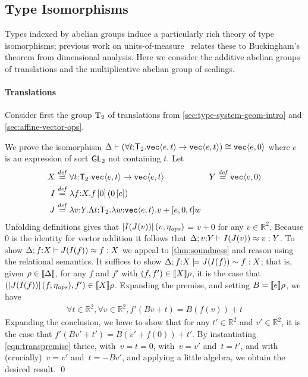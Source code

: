 \subsection{Type Isomorphisms}
\label{sec:types-indexed-abelian-groups}
Types indexed by abelian groups induce a particularly rich theory of
type isomorphisms; previous work on
units-of-measure~\cite{kennedy97relational} relates these to
Buckingham's theorem from dimensional analysis. Here we consider the
additive abelian groups of translations and the multiplicative abelian
group of scalings.

\paragraph{Translations} 
Consider first the group $\mathrm{T}_2$ of translations from
\autoref{sec:type-system-geom-intro} and 
\autoref{sec:affine-vector-ops}. 

\begin{example}\label{ex:simpletrans}
We prove the isomorphism
$\Delta\vdash(\forall t\mathord:\mathsf{T}_2.\textup{\texttt{vec}}\langle e,t \rangle\to\textup{\texttt{vec}}\langle e,t \rangle) \cong
\textup{\texttt{vec}}\langle e,0 \rangle$ where $e$ is an expression of sort $\mathsf{GL}_2$ not containing $t$.
Let 
\begin{align*}
X & \stackrel{\mathit{def}}=\forall t\mathord:\mathsf{T}_2.\textup{\texttt{vec}}\langle e,t \rangle\to\textup{\texttt{vec}}\langle e,t \rangle
&
Y & \stackrel{\mathit{def}}=\textup{\texttt{vec}}\langle e,0 \rangle\\
I & \stackrel{\mathit{def}}=\lambda f\mathord:X.f\,[0]\,(0\,[e])\\
J & \stackrel{\mathit{def}}=\lambda v\mathord:Y.\Lambda t\mathord:\mathsf{T}_2.\lambda w\mathord:\textup{\texttt{vec}}\langle e,t \rangle.v +[e,0,t] w
\end{align*}
Unfolding definitions gives that $\left| I(J(v))\right|(v,\eta_{\mathit{ops}})$ = $v+0$
for any $v\in\mathbb R ^ 2$.  Because $0$ is the identity for vector
addition it follows that ${\Delta};{v\mathord:Y}\vdash{I(J(v))}\approx{v}:{Y}$.
To show ${\Delta};{f\mathord:X}\vdash{J(I(f))}\approx{f}:{X}$ we appeal to
\autoref{thm:soundness} and reason using the relational semantics.  It
suffices to show ${\Delta};{f\mathord:X}\models{J(I(f))}\sim{f}:{X}$; that
is, given $\rho\in\llbracket \Delta \rrbracket$, for any $f$ and $f'$ with
$(f,f')\in\llbracket X \rrbracket\rho$, it is the case that 
$(\left| J(I(f))\right|(f,\eta_{\mathit{ops}}), f')\in\llbracket X \rrbracket\rho$.
Expanding the premise, and setting $B = \llbracket e \rrbracket\rho$, we have
\begin{eqnarray}\label{eqn:transpremise}
\forall t\in \mathbb R ^ 2,
\forall v\in \mathbb R ^ 2,
f'(Bv + t) = B(f(v)) + t
\end{eqnarray}
Expanding the conclusion, we have to show that for any
$t'\in\mathbb R^2$ and $v'\in\mathbb R^2$, it is the case that
$f'(Bv' + t') = B(v' + f(0)) + t'$.
By instantiating \autoref{eqn:transpremise} thrice, with~$v=t=0$, with~$v=v'$ and~$t=t'$,
and with (crucially)~$v=v'$ and~$t=-Bv'$, and applying a little algebra, we obtain
the desired result.
\qed
\end{example}

